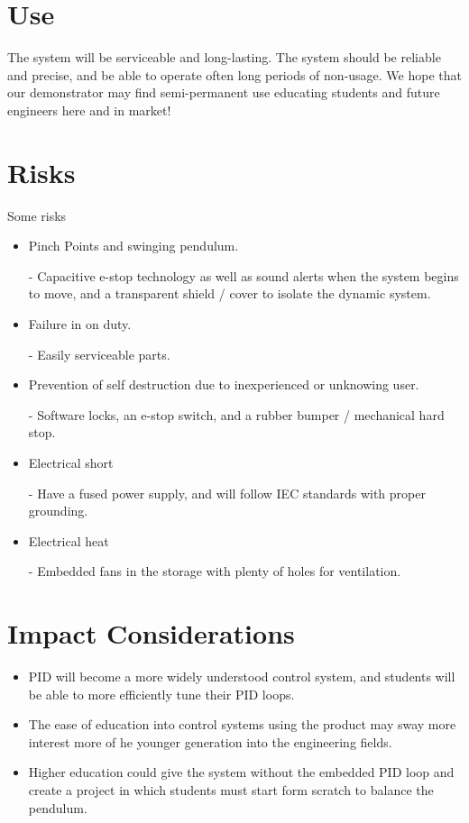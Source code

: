 \documentclass{article}
\begin{document}
\section{Use}
    The system will be serviceable and long-lasting. The system should be reliable and precise, and be able to operate often long periods of non-usage.
    \vspace{.5cm}
    We hope that our demonstrator may find semi-permanent use educating students and future
    engineers here and in market!


\section{Risks}

    Some risks

    \begin{itemize}
        \item Pinch Points and swinging pendulum.
        \item [-] Capacitive e-stop technology as well as sound alerts when the system begins to move, and a transparent shield / cover to isolate the dynamic system.
        \item Failure in on duty.
        \item [-] Easily serviceable parts.
        \item Prevention of self destruction due to inexperienced or unknowing user.
        \item [-] Software locks, an e-stop switch, and a rubber bumper / mechanical hard stop.
        \item Electrical short
        \item [-] Have a fused power supply, and will follow IEC standards with proper grounding.
        \item Electrical heat
        \item [-] Embedded fans in the storage with plenty of holes for ventilation.
    \end{itemize}


\section{Impact Considerations}

\begin{itemize}
    \item PID will become a more widely understood control system, and students will be able to more efficiently tune their PID loops.
    \item The ease of education into control systems using the product may sway more interest more of he younger generation into the engineering fields.
    \item Higher education could give the system without the embedded PID loop and create a project in which students must start form scratch to balance the pendulum.

\end{itemize}
\end{document}
